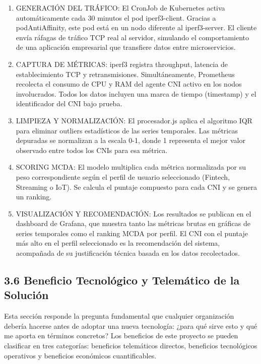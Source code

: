 \documentclass[journal]{IEEEtran}
\begin{document}
\begin{enumerate}

\item GENERACIÓN DEL TRÁFICO: El CronJob de Kubernetes activa automáticamente cada 30 minutos el pod iperf3-client. Gracias a podAntiAffinity, este pod está en un nodo diferente al iperf3-server. El cliente envía ráfagas de tráfico TCP real al servidor, simulando el comportamiento de una aplicación empresarial que transfiere datos entre microservicios.

\item CAPTURA DE MÉTRICAS: iperf3 registra throughput, latencia de establecimiento TCP y retransmisiones. Simultáneamente, Prometheus recolecta el consumo de CPU y RAM del agente CNI activo en los nodos involucrados. Todos los datos incluyen una marca de tiempo (timestamp) y el identificador del CNI bajo prueba.

\item LIMPIEZA Y NORMALIZACIÓN: El procesador.js aplica el algoritmo IQR para eliminar outliers estadísticos de las series temporales. Las métricas depuradas se normalizan a la escala 0-1, donde 1 representa el mejor valor observado entre todos los CNIs para esa métrica.

\item SCORING MCDA: El modelo multiplica cada métrica normalizada por su peso correspondiente según el perfil de usuario seleccionado (Fintech, Streaming o IoT). Se calcula el puntaje compuesto para cada CNI y se genera un ranking.

\item VISUALIZACIÓN Y RECOMENDACIÓN: Los resultados se publican en el dashboard de Grafana, que muestra tanto las métricas brutas en gráficas de series temporales como el ranking MCDA por perfil. El CNI con el puntaje más alto en el perfil seleccionado es la recomendación del sistema, acompañada de su justificación técnica basada en los datos recolectados.

\end{enumerate}

\subsection{3.6 Beneficio Tecnológico y Telemático de la Solución}

Esta sección responde la pregunta fundamental que cualquier organización debería hacerse antes de adoptar una nueva tecnología: ¿para qué sirve esto y qué me aporta en términos concretos? Los beneficios de este proyecto se pueden clasificar en tres categorías: beneficios telemáticos directos, beneficios tecnológicos operativos y beneficios económicos cuantificables.
\end{document}
